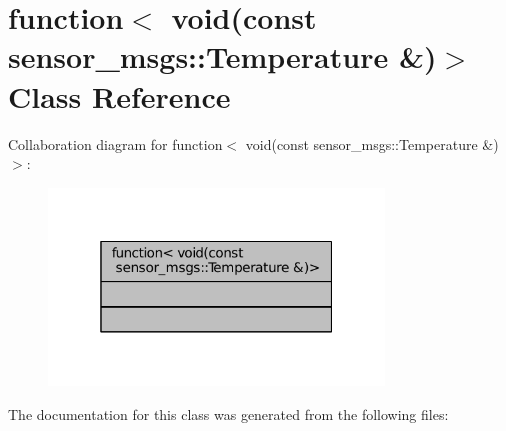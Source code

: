 \hypertarget{classstd_1_1function_3_01void_07const_01sensor__msgs_1_1Temperature_01_6_08_4}{}\section{function$<$ void(const sensor\+\_\+msgs\+:\+:Temperature \&)$>$ Class Reference}
\label{classstd_1_1function_3_01void_07const_01sensor__msgs_1_1Temperature_01_6_08_4}


Collaboration diagram for function$<$ void(const sensor\+\_\+msgs\+:\+:Temperature \&)$>$\+:
\nopagebreak
\begin{figure}[H]
\begin{center}
\leavevmode
\includegraphics[width=253pt]{classstd_1_1function_3_01void_07const_01sensor__msgs_1_1Temperature_01_6_08_4__coll__graph}
\end{center}
\end{figure}


The documentation for this class was generated from the following files\+: